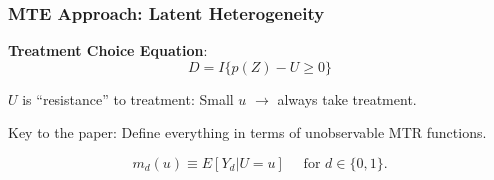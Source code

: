 \documentclass[11pt, aspectratio=169]{beamer}
\newcommand{\indep}{\perp\!\!\!\!\perp}
\begin{document}
\begin{frame}
    \frametitle{MTE Approach: Latent Heterogeneity}

    \textbf{Treatment Choice Equation}:
    \begin{equation}
        D = I\{p(Z) - U \geq 0\}
    \end{equation}

    \vspace{0.5cm}

    $U$ is ``resistance'' to treatment: Small $u$ $\rightarrow$ always take treatment.

    \vspace{0.5cm}

    Key to the paper: Define everything in terms of unobservable MTR functions.

    \begin{equation}
        m_d(u) \equiv E[Y_d | U=u] \quad \text{ for } d\in\{0, 1\}.
    \end{equation}

\end{frame}




\end{document}
